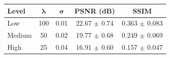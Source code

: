 \begin{tabular}{@{}lcccc@{}}
\toprule
\textbf{Level} & $\boldsymbol{\lambda}$ & $\boldsymbol{\sigma}$ & \textbf{PSNR (dB)} & \textbf{SSIM} \\
\midrule
Low & 100 & 0.01 & 22.67 $\pm$ 0.74 & 0.363 $\pm$ 0.083 \\
Medium & 50 & 0.02 & 19.77 $\pm$ 0.68 & 0.249 $\pm$ 0.069 \\
High & 25 & 0.04 & 16.91 $\pm$ 0.60 & 0.157 $\pm$ 0.047 \\
\bottomrule
\end{tabular}
